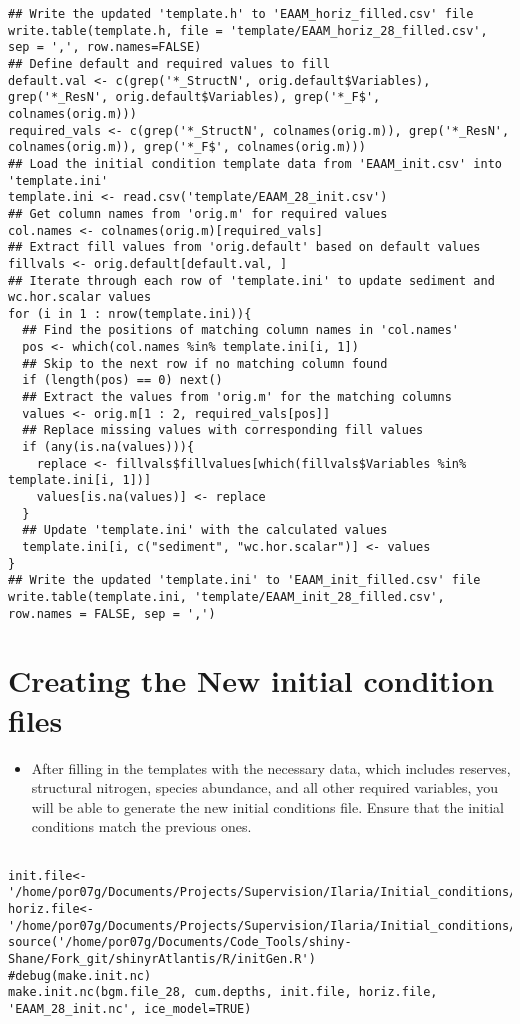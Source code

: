 \documentclass[a4paper]{article}
\begin{document}
\begin{verbatim}
## Write the updated 'template.h' to 'EAAM_horiz_filled.csv' file
write.table(template.h, file = 'template/EAAM_horiz_28_filled.csv', sep = ',', row.names=FALSE)
## Define default and required values to fill
default.val <- c(grep('*_StructN', orig.default$Variables), grep('*_ResN', orig.default$Variables), grep('*_F$', colnames(orig.m)))
required_vals <- c(grep('*_StructN', colnames(orig.m)), grep('*_ResN', colnames(orig.m)), grep('*_F$', colnames(orig.m)))
## Load the initial condition template data from 'EAAM_init.csv' into 'template.ini'
template.ini <- read.csv('template/EAAM_28_init.csv')
## Get column names from 'orig.m' for required values
col.names <- colnames(orig.m)[required_vals]
## Extract fill values from 'orig.default' based on default values
fillvals <- orig.default[default.val, ]
## Iterate through each row of 'template.ini' to update sediment and wc.hor.scalar values
for (i in 1 : nrow(template.ini)){
  ## Find the positions of matching column names in 'col.names'
  pos <- which(col.names %in% template.ini[i, 1])
  ## Skip to the next row if no matching column found
  if (length(pos) == 0) next()
  ## Extract the values from 'orig.m' for the matching columns
  values <- orig.m[1 : 2, required_vals[pos]]
  ## Replace missing values with corresponding fill values
  if (any(is.na(values))){
    replace <- fillvals$fillvalues[which(fillvals$Variables %in% template.ini[i, 1])]
    values[is.na(values)] <- replace
  }
  ## Update 'template.ini' with the calculated values
  template.ini[i, c("sediment", "wc.hor.scalar")] <- values
}
## Write the updated 'template.ini' to 'EAAM_init_filled.csv' file
write.table(template.ini, 'template/EAAM_init_28_filled.csv', row.names = FALSE, sep = ',')
\end{verbatim}

\section{Creating the New initial condition files}
\label{sec:org163d7cd}
\begin{itemize}
\item After filling in the templates with the necessary data, which includes reserves,
structural nitrogen, species abundance, and all other required variables, you will
be able to generate the new initial conditions file. Ensure that the initial
conditions match the previous ones.
\end{itemize}
\begin{verbatim}

init.file<- '/home/por07g/Documents/Projects/Supervision/Ilaria/Initial_conditions/template/EAAM_init_28_filled.csv'
horiz.file<-'/home/por07g/Documents/Projects/Supervision/Ilaria/Initial_conditions/template/EAAM_horiz_28_filled.csv'
source('/home/por07g/Documents/Code_Tools/shiny-Shane/Fork_git/shinyrAtlantis/R/initGen.R')
#debug(make.init.nc)
make.init.nc(bgm.file_28, cum.depths, init.file, horiz.file, 'EAAM_28_init.nc', ice_model=TRUE)
\end{verbatim}
\end{document}
